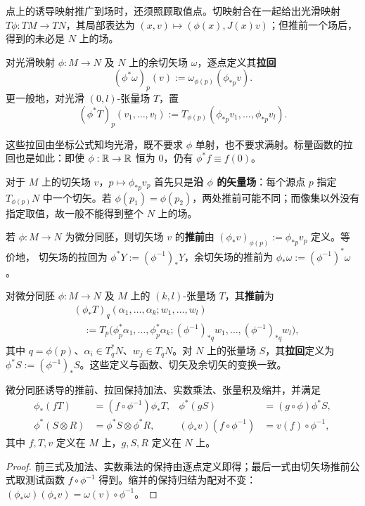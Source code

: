点上的诱导映射推广到场时，还须照顾取值点。切映射合在一起给出光滑映射 $T\phi:TM\to TN$，其局部表达为 $(x,v)\mapsto(\phi(x),J(x)v)$；但推前一个场后，得到的未必是 $N$ 上的场。

\begin{definition}
    对光滑映射 $\phi:M\to N$ 及 $N$ 上的余切矢场 $\omega$，逐点定义其\textbf{拉回}
    \[
        (\phi^*\omega)_p(v):=\omega_{\phi(p)}(\phi_{*p}v).
    \]
    更一般地，对光滑 $(0,l)$-张量场 $T$，置
    \[
        (\phi^*T)_p(v_1,\ldots,v_l)
        :=T_{\phi(p)}(\phi_{*p}v_1,\ldots,\phi_{*p}v_l).
    \]
\end{definition}

这些拉回由坐标公式知均光滑，既不要求 $\phi$ 单射，也不要求满射。标量函数的拉回也是如此：即使 $\phi:\mathbb{R}\to\mathbb{R}$ 恒为 $0$，仍有 $\phi^*f\equiv f(0)$。

对于 $M$ 上的切矢场 $v$，$p\mapsto\phi_{*p}v_p$ 首先只是\textbf{沿 $\phi$ 的矢量场}：每个源点 $p$ 指定 $T_{\phi(p)}N$ 中一个切矢。若 $\phi(p_1)=\phi(p_2)$，两处推前可能不同；而像集以外没有指定取值，故一般不能得到整个 $N$ 上的场。

\begin{definition}
    若 $\phi:M\to N$ 为微分同胚，则切矢场 $v$ 的\textbf{推前}由 $(\phi_*v)_{\phi(p)}:=\phi_{*p}v_p$ 定义。等价地，
    切矢场的拉回为 $\phi^*Y:=(\phi^{-1})_*Y$，余切矢场的推前为 $\phi_*\omega:=(\phi^{-1})^*\omega$。
\end{definition}

\begin{definition}
    对微分同胚 $\phi:M\to N$ 及 $M$ 上的 $(k,l)$-张量场 $T$，其\textbf{推前}为
    \[
    \begin{aligned}
        &(\phi_*T)_q(\alpha_1,\ldots,\alpha_k;w_1,\ldots,w_l)\\
        &\quad:=T_p\bigl(\phi_p^*\alpha_1,\ldots,\phi_p^*\alpha_k;
        (\phi^{-1})_{*q}w_1,\ldots,(\phi^{-1})_{*q}w_l\bigr),
    \end{aligned}
    \]
    其中 $q=\phi(p)$、$\alpha_i\in T_q^*N$、$w_j\in T_qN$。对 $N$ 上的张量场 $S$，其\textbf{拉回}定义为 $\phi^*S:=(\phi^{-1})_*S$。这些定义与函数、切矢及余切矢的变换一致。
\end{definition}

\begin{proposition}\label{chdm:thm_pptt}
    微分同胚诱导的推前、拉回保持加法、实数乘法、张量积及缩并，并满足
    \[
    \begin{aligned}
        \phi_*(fT)&=(f\circ\phi^{-1})\phi_*T,&
        \phi^*(gS)&=(g\circ\phi)\phi^*S,\\
        \phi^*(S\otimes R)&=\phi^*S\otimes\phi^*R,&
        (\phi_*v)(f\circ\phi^{-1})&=v(f)\circ\phi^{-1},
    \end{aligned}
    \]
    其中 $f,T,v$ 定义在 $M$ 上，$g,S,R$ 定义在 $N$ 上。
\end{proposition}
\begin{proof}
    前三式及加法、实数乘法的保持由逐点定义即得；最后一式由切矢场推前公式取测试函数 $f\circ\phi^{-1}$ 得到。缩并的保持归结为配对不变：$(\phi_*\omega)(\phi_*v)=\omega(v)\circ\phi^{-1}$。
\end{proof}

